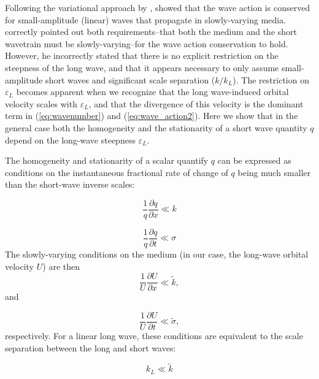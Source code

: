 \documentclass[lineno]{jfm}
\begin{document}
Following the variational approach by \citet{whitham1965general},
\citet{bretherton1968wavetrains} showed that the wave action is conserved for
small-amplitude (linear) waves that propagate in slowly-varying media.
\citet{longuet1987propagation} correctly pointed out both
requirements--that both the medium and the short wavetrain must be
slowly-varying--for the wave action conservation to hold.
However, he incorrectly stated that there is no explicit restriction on the
steepness of the long wave, and that it appears necessary to only assume
small-amplitude short waves and significant scale separation ($k/k_L$).
The restriction on $\varepsilon_L$ becomes apparent when we recognize
that the long wave-induced orbital velocity scales with $\varepsilon_L$, and
that the divergence of this velocity is the dominant term in (\ref{eq:wavenumber})
and (\ref{eq:wave_action2}).
Here we show that in the general case both the homogeneity and the stationarity
of a short wave quantity $q$ depend on the long-wave steepness $\varepsilon_L$.

The homogeneity and stationarity of a scalar quantify $q$ can be expressed as
conditions on the instantaneous fractional rate of change of $q$ being much
smaller than the short-wave inverse scales:

\begin{equation}
  \frac{1}{q} \frac{\partial q}{\partial x} \ll k
  \label{eq:homogeneity_condition}
\end{equation}

\begin{equation}
  \frac{1}{q} \frac{\partial q}{\partial t} \ll \sigma
  \label{eq:stationarity_condition}
\end{equation}
The slowly-varying conditions on the medium (in our case, the long-wave orbital
velocity $U$) are then
\begin{equation}
  \frac{1}{U} \frac{\partial U}{\partial x} \ll \widetilde{k},
\end{equation}
and

\begin{equation}
  \frac{1}{U} \frac{\partial U}{\partial t} \ll \widetilde{\sigma},
\end{equation}
respectively.
For a linear long wave, these conditions are equivalent to the scale separation
between the long and short waves:

\begin{equation}
  k_L \ll \widetilde{k}
  \label{eq:k_scale_separation}
\end{equation}
\end{document}
